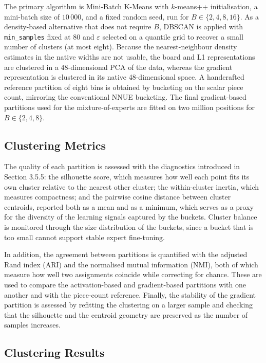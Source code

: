 The primary algorithm is Mini-Batch K-Means with $k$-means++ initialisation, a mini-batch size of $10\,000$, and a fixed random seed, run for $B \in \{2, 4, 8, 16\}$. As a density-based alternative that does not require $B$, DBSCAN is applied with \texttt{min\_samples} fixed at $80$ and $\varepsilon$ selected on a quantile grid to recover a small number of clusters (at most eight). Because the nearest-neighbour density estimates in the native widths are not usable, the board and L1 representations are clustered in a 48-dimensional PCA of the data, whereas the gradient representation is clustered in its native 48-dimensional space. A handcrafted reference partition of eight bins is obtained by bucketing on the scalar piece count, mirroring the conventional NNUE bucketing. The final gradient-based partitions used for the mixture-of-experts are fitted on two million positions for $B \in \{2, 4, 8\}$.

\subsection{Clustering Metrics}

The quality of each partition is assessed with the diagnostics introduced in Section 3.5.5: the silhouette score, which measures how well each point fits its own cluster relative to the nearest other cluster; the within-cluster inertia, which measures compactness; and the pairwise cosine distance between cluster centroids, reported both as a mean and as a minimum, which serves as a proxy for the diversity of the learning signals captured by the buckets. Cluster balance is monitored through the size distribution of the buckets, since a bucket that is too small cannot support stable expert fine-tuning.

In addition, the agreement between partitions is quantified with the adjusted Rand index (ARI) and the normalised mutual information (NMI), both of which measure how well two assignments coincide while correcting for chance. These are used to compare the activation-based and gradient-based partitions with one another and with the piece-count reference. Finally, the stability of the gradient partition is assessed by refitting the clustering on a larger sample and checking that the silhouette and the centroid geometry are preserved as the number of samples increases.

\subsection{Clustering Results}

